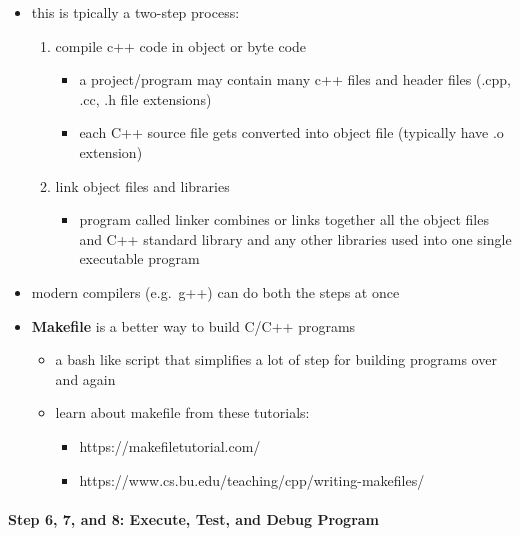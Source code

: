 \documentclass[11pt]{article}
\providecommand{\tightlist}{%
      \setlength{\itemsep}{0pt}\setlength{\parskip}{0pt}}
\begin{document}
\begin{itemize}
\tightlist
\item
  this is tpically a two-step process:

  \begin{enumerate}
  \def\labelenumi{\arabic{enumi}.}
  \tightlist
  \item
    compile c++ code in object or byte code

    \begin{itemize}
    \tightlist
    \item
      a project/program may contain many c++ files and header files
      (.cpp, .cc, .h file extensions)
    \item
      each C++ source file gets converted into object file (typically
      have .o extension)
    \end{itemize}
  \item
    link object files and libraries

    \begin{itemize}
    \tightlist
    \item
      program called linker combines or links together all the object
      files and C++ standard library and any other libraries used into
      one single executable program
    \end{itemize}
  \end{enumerate}
\item
  modern compilers (e.g.~g++) can do both the steps at once
\item
  \textbf{Makefile} is a better way to build C/C++ programs

  \begin{itemize}
  \tightlist
  \item
    a bash like script that simplifies a lot of step for building
    programs over and again
  \item
    learn about makefile from these tutorials:

    \begin{itemize}
    \tightlist
    \item
      https://makefiletutorial.com/
    \item
      https://www.cs.bu.edu/teaching/cpp/writing-makefiles/
    \end{itemize}
  \end{itemize}
\end{itemize}

\hypertarget{step-6-7-and-8-execute-test-and-debug-program}{%
\paragraph{Step 6, 7, and 8: Execute, Test, and Debug
Program}\label{step-6-7-and-8-execute-test-and-debug-program}}
\end{document}
